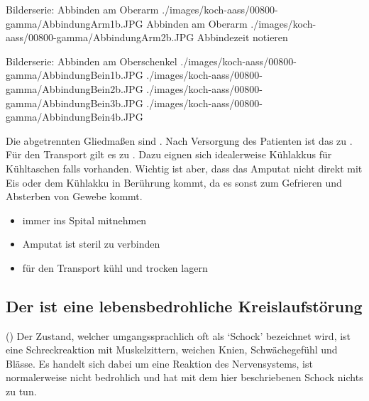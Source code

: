 \begin{PictureSeries}{}{Bilderserie: Abbinden am Oberarm}
{./images/koch-aass/00800-gamma/AbbindungArm1b.JPG}
{Abbinden am Oberarm}
{./images/koch-aass/00800-gamma/AbbindungArm2b.JPG}
{Abbindezeit notieren}
{}
{}
{}
{}
\end{PictureSeries}

\begin{PictureSeries}{}{Bilderserie: Abbinden am Oberschenkel}
{./images/koch-aass/00800-gamma/AbbindungBein1b.JPG}
{}
{./images/koch-aass/00800-gamma/AbbindungBein2b.JPG}
{}
{}
{}
{}
{}
{./images/koch-aass/00800-gamma/AbbindungBein3b.JPG}
{}
{./images/koch-aass/00800-gamma/AbbindungBein4b.JPG}
{}
{}
{}
{}
{}
\end{PictureSeries}


\clearpage
{}
{
Die abgetrennten Gliedmaßen sind . Nach
Versorgung des Patienten ist das  zu . Für
den Transport gilt es  zu . Dazu eignen
sich idealerweise Kühlakkus für Kühltaschen falls vorhanden. Wichtig ist aber,
dass das Amputat  nicht direkt mit Eis oder dem Kühlakku in Berührung
kommt, da es sonst zum Gefrieren und Absterben von Gewebe kommt.
}{
\begin{itemize}
  \item immer ins Spital mitnehmen
  \item Amputat ist steril zu verbinden
  \item für den Transport kühl und trocken lagern
\end{itemize}
}{}{}{}




\subsection{Der  ist eine lebensbedrohliche Kreislaufstörung}

\Text
{{\TxBeschreibung}}%
{%
%
\label{topic:schock-ehi}%
 ()
Der Zustand, 
welcher umgangssprachlich oft als \enquote*{Schock} bezeichnet wird, 
ist eine Schreckreaktion mit Muskelzittern,
weichen Knien, Schwächegefühl und Blässe. 
Es handelt sich dabei um eine Reaktion des Nervensystems, 
ist normalerweise nicht bedrohlich 
und hat mit dem hier beschriebenen Schock nichts zu tun. 
}%


